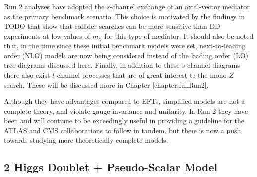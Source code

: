 



Run 2 analyses have adopted the $s$-channel exchange of an axial-vector mediator as the primary benchmark scenario. This choice is motivated by the findings in TODO that show that collider searches can be more sensitive than DD experiments at low values of $m_\chi$ for this type of mediator. It should also be noted that, in the time since these initial benchmark models were set, next-to-leading order (NLO) models are now being considered instead of the leading order (LO) tree diagrams discussed here. Finally, in addition to these $s$-channel diagrams there also exist $t$-channel processes that are of great interest to the mono-$Z$ search. These will be discussed more in Chapter \ref{chapter:fullRun2}.

Although they have advantages compared to EFTs, simplified models are not a complete theory, and violate gauge invariance and unitarity. In Run 2 they have been and will continue to be exceedingly useful in providing a guideline for the ATLAS and CMS collaborations to follow in tandem, but there is now a push towards studying more theoretically complete models.

\subsection{2 Higgs Doublet + Pseudo-Scalar Model}

